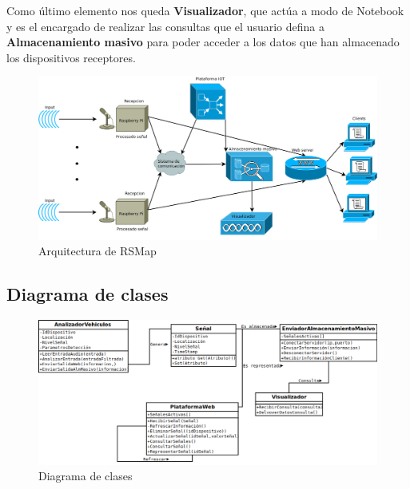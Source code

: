 Como último elemento nos queda \textbf{Visualizador}, que actúa a modo de Notebook y es el encargado de realizar las consultas que el usuario defina a \textbf{Almacenamiento masivo} para poder acceder a los datos que han almacenado los dispositivos receptores.

\begin{figure}[!ht]
  \begin{center}
  \includegraphics[scale=0.35]{../images/diag_plan/diag_arqu.png}
  \caption{Arquitectura de RSMap}
  \label{fig:ar_rsmap}
  \end{center}
\end{figure}

\newpage

\subsection{Diagrama de clases}

\begin{figure}[!ht]
  \begin{center}
  \includegraphics[scale=0.4]{../images/diag_plan/clases.png}
  \caption{Diagrama de clases}
  \label{fig:ar_rsmap}
  \end{center}
\end{figure}

\newpage

